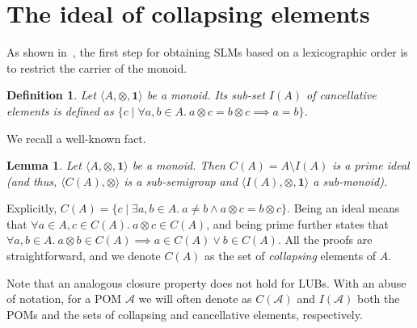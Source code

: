\documentclass[a4paper]{elsarticle}
\newtheorem{definition}{Definition}
\newtheorem{lemma}{Lemma}
\newcommand{\monop}{\otimes}
\newcommand{\1}{\mathbf{1}}
\begin{document}

\section{The ideal of collapsing elements}
\label{sec:collapsing}
As shown in~\cite{GadducciHMW13}, the first step for obtaining SLMs based on a lexicographic order 
is to restrict the carrier of the monoid. 

\begin{definition}
	Let $\langle A, \monop, \1 \rangle$ be a monoid. Its sub-set $I(A)$ 
	of \emph{cancellative} elements is defined as 
	$\{ c \mid \forall a, b \in A.\ a \otimes c = b \otimes c \implies a = b \}$.
\end{definition}

We  recall a well-known fact.

\begin{lemma}
	\label{ideal}
	Let $\langle A, \monop, \1 \rangle$ be a monoid.
	Then $C(A) = A\setminus I(A)$ is
	a prime ideal (and thus, $\langle C(A), \monop \rangle$ is a sub-semigroup
	and $\langle I(A), \monop, \1 \rangle$ a sub-monoid).
\end{lemma}

Explicitly, $C(A) = \{ c \mid \exists a, b \in A.\ a \neq b \wedge a \otimes c = b \otimes c\}$.
%
Being an ideal means that $\forall a \in A, c \in C( A).\ a \otimes c \in C(A)$,
and being prime further states that 
$\forall a, b \in A.\ a\otimes b \in C( A) \implies a \in C(A) \vee b \in C(A)$.
%
All the proofs are straightforward, and we denote $C(A)$ as the set of \emph{collapsing} 
elements of $A$. 

Note that an analogous closure property does not hold for LUBs. With an abuse of notation,
for a POM $\mathcal{A}$ we will often denote as $C(\mathcal{A})$ and $I(\mathcal{A})$ both the POMs 
and the sets of collapsing and cancellative elements, respectively.
\end{document}
